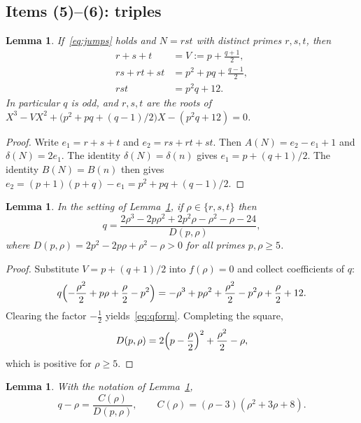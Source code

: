\documentclass[11pt,reqno]{amsart}
\newtheorem{lemma}[theorem]{Lemma}
\theoremstyle{definition}
\begin{document}
\subsection{Items (5)--(6): triples}

\begin{lemma}
\label{lem:e123}
If~\eqref{eq:jumps} holds and \(N=rst\) with distinct primes \(r,s,t\), then
\begin{align}
\label{eq:e1}
r+s+t&=V:=p+\frac{q+1}{2},\\
\label{eq:e2}
rs+rt+st&=p^2+pq+\frac{q-1}{2},\\
\label{eq:e3}
rst&=p^2q+12.
\end{align}
In particular \(q\) is odd, and \(r,s,t\) are the roots of \(X^3-VX^2+\bigl(p^2+pq+(q-1)/2\bigr)X-(p^2q+12)=0\).
\end{lemma}

\begin{proof}
Write \(e_1=r+s+t\) and \(e_2=rs+rt+st\). Then \(A(N)=e_2-e_1+1\) and \(\delta(N)=2e_1\). The identity \(\delta(N)=\delta(n)\) gives \(e_1=p+(q+1)/2\). The identity \(B(N)=B(n)\) then gives \(e_2=(p+1)(p+q)-e_1=p^2+pq+(q-1)/2\).
\end{proof}

\begin{lemma}
\label{lem:qform}
In the setting of Lemma~\ref{lem:e123}, if \(\rho\in\{r,s,t\}\) then
\begin{equation}
\label{eq:qform}
q=\frac{2\rho^3-2p\rho^2+2p^2\rho-\rho^2-\rho-24}{D(p,\rho)},
\end{equation}
where \(D(p,\rho)=2p^2-2p\rho+\rho^2-\rho>0\) for all primes \(p,\rho\ge 5\).
\end{lemma}

\begin{proof}
Substitute \(V=p+(q+1)/2\) into \(f(\rho)=0\) and collect coefficients of \(q\):
\[
q\Bigl(-\frac{\rho^2}{2}+p\rho+\frac{\rho}{2}-p^2\Bigr)
=-\rho^3+p\rho^2+\frac{\rho^2}{2}-p^2\rho+\frac{\rho}{2}+12.
\]
Clearing the factor \(-\tfrac12\) yields~\eqref{eq:qform}. Completing the square,
\[
D(p,\rho)=2\Bigl(p-\frac{\rho}{2}\Bigr)^2+\frac{\rho^2}{2}-\rho,
\]
which is positive for \(\rho\ge 5\).
\end{proof}

\begin{lemma}
\label{lem:C}
With the notation of Lemma~\ref{lem:qform},
\[
q-\rho=\frac{C(\rho)}{D(p,\rho)},\qquad C(\rho)=(\rho-3)(\rho^2+3\rho+8).
\]
\end{lemma}
\end{document}
